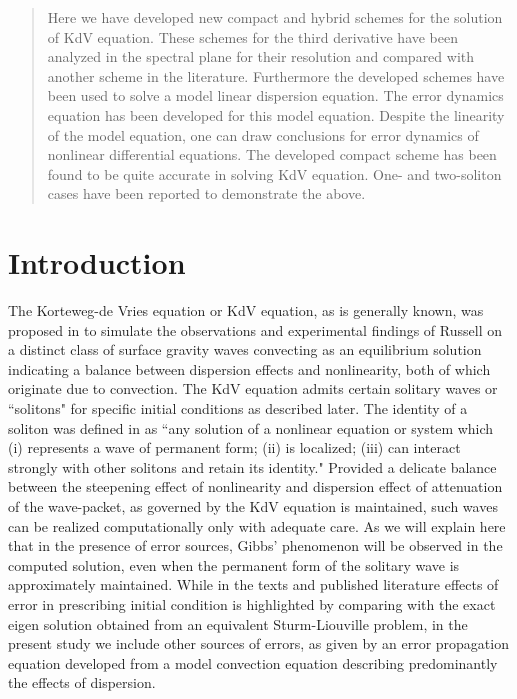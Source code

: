\begin{abstract}
Here we have developed new compact and hybrid schemes for the solution of KdV equation. These schemes for the third derivative have been analyzed 
in the spectral plane for their resolution and compared with another scheme in the literature. Furthermore the developed schemes have been used
to solve a model linear dispersion equation. The error dynamics equation has been developed for this model equation. Despite the linearity of the 
model equation, one can draw conclusions for error dynamics of nonlinear differential equations. The developed compact scheme has been found to be 
quite accurate in solving KdV equation. One- and two-soliton cases have been reported to demonstrate the above.

 
\end{abstract}



\section{Introduction}

The Korteweg-de Vries equation or KdV equation, as is generally known, was proposed in \cite{Informa} to simulate the observations and experimental findings of Russell \cite{Russell1844} on a distinct class of surface gravity waves convecting as an equilibrium solution indicating a balance between dispersion effects and nonlinearity, both of which originate due to convection. The KdV equation admits certain solitary waves or ``solitons" for specific initial conditions as described later. The identity of a soliton was defined in \cite{Drazin1989} as ``any solution of a nonlinear equation or system which (i) represents a wave of permanent form; (ii) is localized; (iii) can interact strongly with other solitons and retain its identity." Provided a delicate balance between the steepening effect of nonlinearity and dispersion effect of attenuation of the wave-packet, as governed by the KdV equation is maintained, such waves can be realized computationally only with adequate care. As we will explain here that in the presence of error sources, Gibbs' phenomenon will be observed in the computed solution, even when the permanent form of the solitary wave is approximately maintained. While in the texts \cite{Drazin1989}
and published literature \cite{Fornberg1978} effects of error in prescribing initial condition is highlighted by comparing with the exact eigen solution obtained from an equivalent Sturm-Liouville problem, in the present study we include other sources of errors, as given by an error propagation equation developed from a model convection equation describing predominantly the effects of dispersion. 

